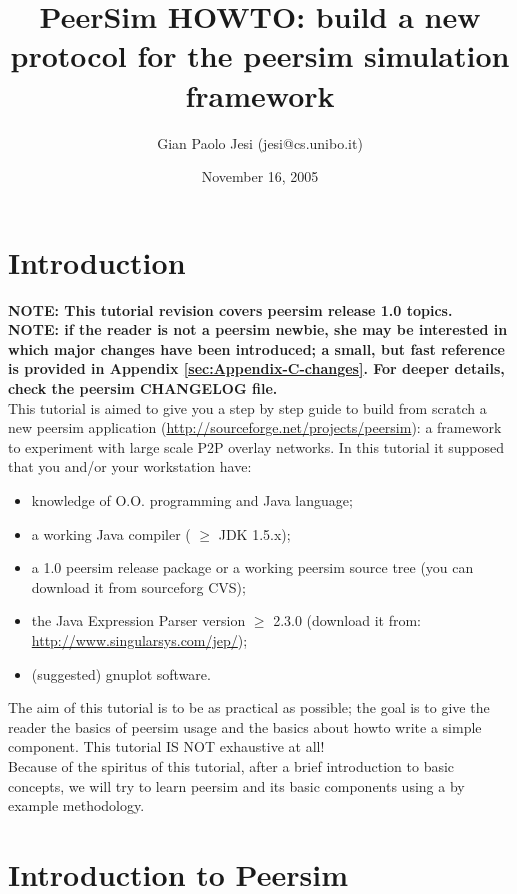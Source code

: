 \documentclass[a4paper,11pt]{article}
\title{PeerSim HOWTO: build a new protocol for the peersim simulation
framework}
\author{Gian Paolo Jesi (jesi@cs.unibo.it)}
\date{November 16, 2005}
\begin{document}
\maketitle



\section{Introduction}

\textbf{NOTE: This tutorial revision covers peersim release 1.0
  topics.}\\


\textbf{NOTE: if the reader is not a peersim newbie, she may be
  interested in which major changes have been introduced; a small, but
  fast reference is provided in Appendix
  \ref{sec:Appendix-C-changes}. For deeper details, check the peersim
  CHANGELOG file.}\\


This tutorial is aimed to give you a step by step guide to build from
scratch a new peersim application
(\url{http://sourceforge.net/projects/peersim}): 
a framework to experiment with large scale P2P overlay networks. In
this tutorial it supposed that you and/or your workstation have: 

\begin{itemize}
\item knowledge of O.O. programming and Java language;
\item a working Java compiler ( $\geq$ JDK 1.5.x);
\item a 1.0 peersim release package or a working peersim source tree
  (you can download it from sourceforg CVS);
\item the Java Expression Parser version $\geq$ 2.3.0 (download it from: \url{http://www.singularsys.com/jep/});
\item (suggested) gnuplot software. 
\end{itemize}

The aim of this tutorial is to be
as practical as possible; the goal is to give the reader the basics
of peersim usage and the basics about howto write a simple component.
This tutorial IS NOT exhaustive at all!\\

Because of the spiritus of this tutorial,
after a brief introduction to basic concepts, we will try to learn peersim
and its basic components
using a by example methodology.


\section{Introduction to Peersim}
\end{document}
